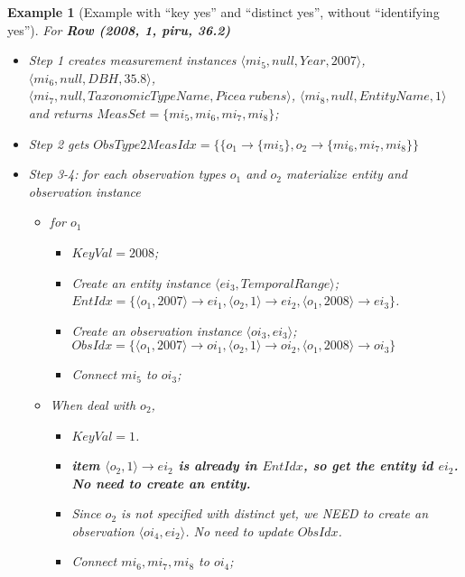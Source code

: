 \documentclass[10pt]{article}
\newtheorem{example}{Example}[section]
\begin{document}
\begin{example} [Example with ``key yes'' and ``distinct yes'', without ``identifying yes'']
    
For {\bf Row (2008, 1, piru, 36.2)}
    \begin{itemize}
    \item Step 1 creates measurement instances $\langle mi_5, null, Year, 2007\rangle$,
    $\langle mi_6, null, DBH, 35.8\rangle$,\\
    $\langle mi_7, null, TaxonomicTypeName, Picea~rubens\rangle$,
    $\langle mi_8, null, EntityName, 1\rangle$\\
    and returns $MeasSet = \{mi_5, mi_6, mi_7, mi_8\}$;
    \item Step 2 gets $ObsType2MeasIdx = \{\{o_1\rightarrow \{mi_5\}, o_2 \rightarrow \{mi_6, mi_7, mi_8\}\}$
    \item Step 3-4: for each observation types $o_1$ and $o_2$ materialize entity and observation instance
        \begin{itemize}
            \item for $o_1$
            \begin{itemize}
            \item  $KeyVal=2008$;
            \item Create an entity instance $\langle ei_3, TemporalRange\rangle$; \\
                $EntIdx=\{\langle o_1, 2007 \rangle \rightarrow ei_1, \langle o_2, 1 \rangle \rightarrow ei_2, \langle o_1, 2008 \rangle \rightarrow ei_3\}$.
             \item Create an observation instance $\langle oi_3, ei_3 \rangle$;\\
              $ObsIdx=\{\langle o_1, 2007\rangle\rightarrow oi_1, \langle o_2, 1\rangle\rightarrow oi_2, \langle o_1, 2008\rangle\rightarrow oi_3\}$
		\item Connect $mi_5$ to $oi_3$; 
            \end{itemize}
            \item When deal with $o_2$,
            \begin{itemize}
             \item $KeyVal=1$.
            \item {\bf item $\langle o_2, 1 \rangle \rightarrow ei_2$ is already in $EntIdx$, so get the entity id $ei_2$. No need to create an entity.}
            \item Since $o_2$ is not specified with {\em distinct yet}, we NEED to create an observation $\langle oi_4, ei_2 \rangle$. No need to update $ObsIdx$.
		\item Connect $mi_6, mi_7, mi_8$ to $oi_4$; 
            \end{itemize}

\end{itemize}
\end{itemize}
\end{example}
\end{document}
